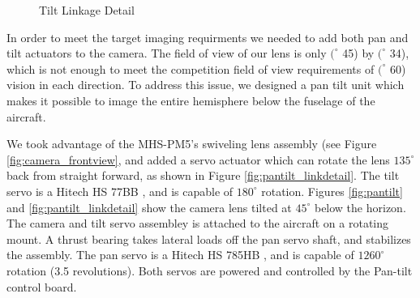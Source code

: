 \documentclass[10pt]{report}
\newcommand{\degrees}[1]
{
\begin{math}
#1^{\circ} 
\end{math}
}
\begin{document}
\begin{figure}
	\caption{Tilt Linkage Detail}
	\label{fig:pantilt_link}
\end{figure}

In order to meet the target imaging requirments we needed to add both pan and tilt actuators to the camera. The field of view of our lens is only \degrees(45) by \degrees(34), which is not enough to meet the competition field of view requirements of \degrees(60) vision in each direction.  To address this issue, we designed a pan tilt unit which makes it possible to image the entire hemisphere below the fuselage of the aircraft.

We took advantage of the MHS-PM5's swiveling lens assembly (see Figure \ref{fig:camera_frontview}, and added a servo actuator which can rotate the lens \degrees{135} back from straight forward, as shown in Figure \ref{fig:pantilt_linkdetail}. The tilt servo is a Hitech HS 77BB \cite{hitechs77bb}, and is capable of \degrees{180} rotation. Figures \ref{fig:pantilt} and \ref{fig:pantilt_linkdetail} show the camera lens tilted at \degrees{45} below the horizon.
The camera and tilt servo assembley is attached to the aircraft on a rotating mount. A thrust bearing takes lateral loads off the pan servo shaft, and stabilizes the assembly. The pan servo is a Hitech HS 785HB \cite{hitechs785}, and is capable of \degrees{1260} rotation (3.5 revolutions). Both servos are powered and controlled by the Pan-tilt control board.
\end{document}

